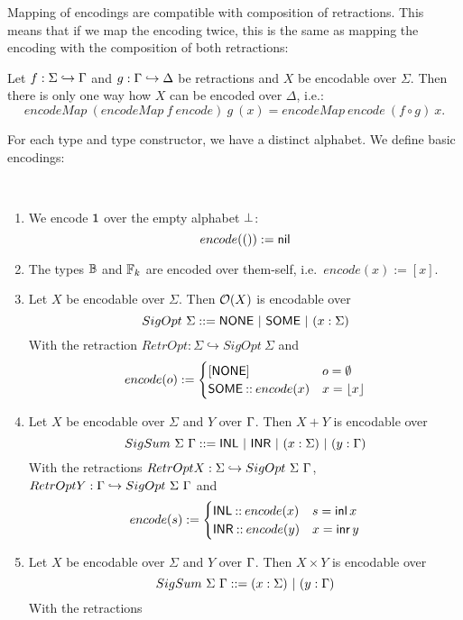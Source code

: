 Mapping of encodings are compatible with composition of retractions.  This means that if we map the encoding twice, this is the same as mapping the
encoding with the composition of both retractions:
\begin{lemma}
  \label{lem:Encode_map_comp}
  Let $f : \Sigma \hookrightarrow \Gamma$ and $g : \Gamma \hookrightarrow \Delta$ be retractions and $X$ be encodable over $\Sigma$.  Then there is only
  one way how $X$ can be encoded over $\Delta$, i.e.:
  \[ encodeMap~(encodeMap~f~encode)~g~(x) = encodeMap~encode~(f \circ g)~x. \]
\end{lemma}

For each type and type constructor, we have a distinct alphabet.  We define basic encodings:
\begin{definition}
  \label{def:basic-encodings}
  ~
  \begin{enumerate}
  \item We encode $\mathsf{1}$ over the empty alphabet $\bot$:
  \[ encode(\mathsf{()}) := \mathsf{nil}
  \]
  \item The types $\mathbb{B}$ and $\mathbb{F}_k$ are encoded over them-self, i.e.\ $encode(x):=[x]$.
  \item Let $X$ be encodable over $\Sigma$.  Then $\mathcal{O}(X)$ is encodable over
    \[ SigOpt~\Sigma ::= \mathsf{NONE} ~|~ \mathsf{SOME} ~|~ (x:\Sigma) \]
    With the retraction $RetrOpt : \Sigma \hookrightarrow SigOpt~\Sigma$ and
    \[
      encode(o) :=
      \begin{cases}
        [\mathsf{NONE}] & o=\emptyset \\
        \mathsf{SOME} \mathbin{::} encode(x) & x=\left\lfloor {x} \right\rfloor
      \end{cases}
    \]
  \item Let $X$ be encodable over $\Sigma$ and $Y$ over $\Gamma$.  Then $X+Y$ is encodable over
    \[ SigSum~\Sigma~\Gamma ::= \mathsf{INL} ~|~ \mathsf{INR} ~|~ (x:\Sigma) ~|~ (y:\Gamma) \] With the retractions
    $RetrOptX : \Sigma \hookrightarrow SigOpt~\Sigma~\Gamma$, $RetrOptY : \Gamma \hookrightarrow SigOpt~\Sigma~\Gamma$ and
    \[
      encode(s) :=
      \begin{cases}
        \mathsf{INL} \mathbin{::} encode(x) & s=\operatorname{\mathsf{inl}} x \\
        \mathsf{INR} \mathbin{::} encode(y) & x=\operatorname{\mathsf{inr}} y
      \end{cases}
    \]
  \item Let $X$ be encodable over $\Sigma$ and $Y$ over $\Gamma$.  Then $X \times Y$ is encodable over
    \[ SigSum~\Sigma~\Gamma ::= (x:\Sigma) ~|~ (y:\Gamma) \] With the retractions

\end{enumerate}
\end{definition}
